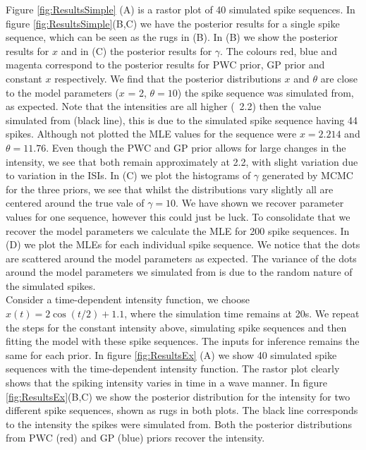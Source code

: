 \documentclass[../main.tex]{subfiles}
\begin{document}
Figure \ref{fig:ResultsSimple} (A) is a rastor plot of 40 simulated spike sequences.  In figure \ref{fig:ResultsSimple}(B,C) we have the posterior results for a single spike sequence, which can be seen as the rugs in (B). In (B) we show the posterior results for $x$ and in (C) the posterior results for $\gamma$. The colours red, blue and magenta correspond to the posterior results for PWC prior, GP prior and constant $x$ respectively. We find that the posterior distributions $x$ and $\theta$ are close to the model parameters ($x$ = 2, $\theta = 10$) the spike sequence was simulated from, as expected. Note that the intensities are all higher (~2.2) then the value simulated from (black line), this is due to the simulated spike sequence having 44 spikes.   Although not plotted the MLE values for the sequence were $x = 2.214$ and $\theta = 11.76$. Even though the PWC and GP prior allows for large changes in the intensity, we see that both remain approximately at 2.2, with slight variation due to variation in the ISIs. In (C) we plot the histograms of $\gamma$ generated by MCMC for the three priors, we see that whilst the distributions vary slightly all are centered around the true vale of $\gamma = 10$.  We have shown we recover parameter values for one sequence, however this could just be luck. To consolidate that we recover the model parameters we calculate the MLE for 200 spike sequences. In (D) we plot the MLEs for each individual spike sequence. We notice that the dots are scattered around the model parameters as expected. The variance of the dots around the model parameters we simulated from is due to the random nature of the simulated spikes. \\
    
 Consider a time-dependent intensity function, we choose $x(t) = 2 \cos(t/2)+1.1$, where the simulation time remains at 20s. We repeat the steps for the constant intensity above, simulating spike sequences and then fitting the model with these spike sequences. The inputs for inference remains the same for each prior. In figure \ref{fig:ResultsEx} (A) we show 40 simulated spike sequences with the time-dependent intensity function. The rastor plot clearly shows that the spiking intensity varies in time in a wave manner. In  figure \ref{fig:ResultsEx}(B,C) we show the posterior distribution for the intensity for two different spike sequences, shown as rugs in both plots. The black line corresponds to the intensity the spikes were simulated from. Both the posterior distributions from PWC (red) and GP (blue) priors recover the intensity. 
\end{document}
